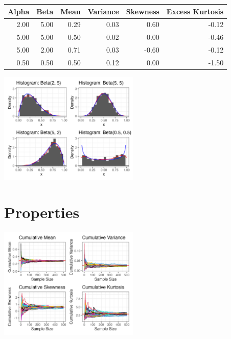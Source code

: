 \documentclass{article}\usepackage[]{graphicx}\usepackage[]{xcolor}
\newenvironment{Figure}
  {\par\medskip\noindent\minipage{\linewidth}}
  {\endminipage\par\medskip}
\begin{document}
\begin{multicols}{2}
\begin{Figure}
\centering
\scriptsize
\begin{tabular}{rrrrrr}
  \hline
 Alpha & Beta & Mean & Variance & Skewness & Excess Kurtosis \\ 
  \hline
2.00 & 5.00 & 0.29 & 0.03 & 0.60 & -0.12 \\ 
5.00 & 5.00 & 0.50 & 0.02 & 0.00 & -0.46 \\ 
5.00 & 2.00 & 0.71 & 0.03 & -0.60 & -0.12 \\ 
0.50 & 0.50 & 0.50 & 0.12 & 0.00 & -1.50 \\ 
   \hline
\end{tabular}
\end{Figure}

\begin{Figure}
\begin{center}
  \includegraphics[width=0.5\textwidth]{task3.png}
\end{center} 
\end{Figure}

\section{Properties}

\begin{Figure}
\begin{center}
  \includegraphics[width=0.5\textwidth]{task4.png}
\end{center} 
\end{Figure}


\end{multicols}
\end{document}
